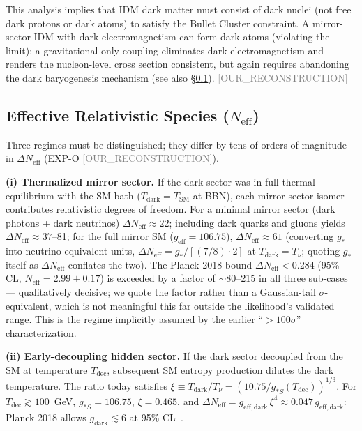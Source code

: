 \documentclass[twocolumn,prd,amsmath,amssymb,floatfix]{revtex4-2}
\newcommand{\reconstruction}{\textcolor{gray}{\small[OUR\_RECONSTRUCTION]}}
\begin{document}
This analysis implies that IDM dark matter must consist of dark nuclei
(not free dark protons or dark atoms) to satisfy the Bullet Cluster constraint.
A mirror-sector IDM with dark electromagnetism can form dark atoms (violating
the limit); a gravitational-only coupling eliminates dark electromagnetism
and renders the nucleon-level cross section consistent, but again requires
abandoning the dark baryogenesis mechanism (see also §\ref{ssec:neff}).
\reconstruction

\subsection{Effective Relativistic Species ($N_\mathrm{eff}$)}
\label{ssec:neff}

Three regimes must be distinguished; they differ by tens of orders of magnitude
in $\Delta N_\mathrm{eff}$ (EXP-O \reconstruction).

\textbf{(i) Thermalized mirror sector.}
If the dark sector was in full thermal equilibrium with the SM bath
($T_\mathrm{dark} = T_\mathrm{SM}$ at BBN), each mirror-sector isomer
contributes relativistic degrees of freedom.  For a minimal mirror sector
(dark photons + dark neutrinos) $\Delta N_\mathrm{eff} \approx 22$;
including dark quarks and gluons yields $\Delta N_\mathrm{eff} \approx 37$--81;
for the full mirror SM ($g_\mathrm{eff} = 106.75$), $\Delta N_\mathrm{eff} \approx 61$
(converting $g_*$ into neutrino-equivalent units, $\Delta N_\mathrm{eff} = g_*/[({7}/{8})\cdot 2]$
at $T_\mathrm{dark}=T_\nu$; quoting $g_*$ itself as $\Delta N_\mathrm{eff}$ conflates the two).
The Planck 2018 bound $\Delta N_\mathrm{eff} < 0.284$ (95\% CL,
$N_\mathrm{eff} = 2.99 \pm 0.17$) is exceeded by a factor of $\sim$80--215
in all three sub-cases --- qualitatively decisive; we quote the factor rather
than a Gaussian-tail $\sigma$-equivalent, which is not meaningful this far
outside the likelihood's validated range.  This is the regime implicitly
assumed by the earlier ``$>100\sigma$'' characterization.

\textbf{(ii) Early-decoupling hidden sector.}
If the dark sector decoupled from the SM at temperature $T_\mathrm{dec}$,
subsequent SM entropy production dilutes the dark temperature.  The ratio today
satisfies $\xi \equiv T_\mathrm{dark}/T_{\nu} = (10.75/g_{*S}(T_\mathrm{dec}))^{1/3}$.
For $T_\mathrm{dec} \gtrsim 100$~GeV, $g_{*S} = 106.75$, $\xi = 0.465$, and
$\Delta N_\mathrm{eff} = g_\mathrm{eff,dark}\,\xi^4 \approx 0.047\,g_\mathrm{eff,dark}$:
Planck 2018 allows $g_\mathrm{dark} \lesssim 6$ at 95\% CL~\cite{chacko2015}.
\end{document}
